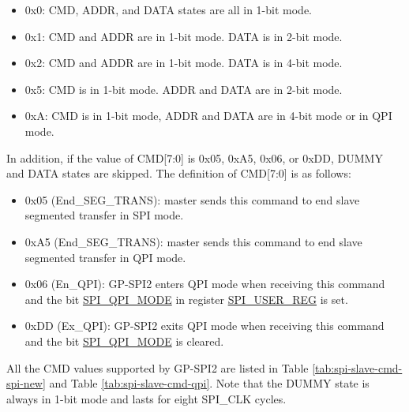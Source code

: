 \documentclass[main\_\_EN.tex]{subfiles}
\begin{document}
\begin{itemize}
    \item 0x0: CMD, ADDR, and DATA states are all in 1-bit mode.
    \item 0x1: CMD and ADDR are in 1-bit mode. DATA is in 2-bit mode.
    \item 0x2: CMD and ADDR are in 1-bit mode. DATA is in 4-bit mode.
    \item 0x5: CMD is in 1-bit mode. ADDR and DATA are in 2-bit mode.
    \item 0xA: CMD is in 1-bit mode, ADDR and DATA are in 4-bit mode or in QPI mode.
\end{itemize}

In addition, if the value of CMD[7:0] is 0x05, 0xA5, 0x06, or 0xDD, DUMMY and DATA states are skipped. The definition of CMD[7:0] is as follows:

\begin{itemize}
    \item \label{cmd:ENDSEGTRANS} 0x05 (End\_SEG\_TRANS): master sends this command to end slave segmented transfer in SPI mode.
    \item 0xA5 (End\_SEG\_TRANS): master sends this command to end slave segmented transfer in QPI mode.
    \item 0x06 (En\_QPI): GP-SPI2 enters QPI mode when receiving this command and the bit \hyperref[fielddesc:SPIQPIMODE]{SPI\_QPI\_MODE} in register \hyperref[regdesc:SPIUSERREG]{SPI\_USER\_REG} is set.
    \item 0xDD (Ex\_QPI): GP-SPI2 exits QPI mode when receiving this command and the bit \hyperref[fielddesc:SPIQPIMODE]{SPI\_QPI\_MODE} is cleared.
\end{itemize}

All the CMD values supported by GP-SPI2 are listed in Table \ref{tab:spi-slave-cmd-spi-new} and Table \ref{tab:spi-slave-cmd-qpi}. Note that the DUMMY state is always in 1-bit mode and lasts for eight SPI\_CLK cycles.
\end{document}
